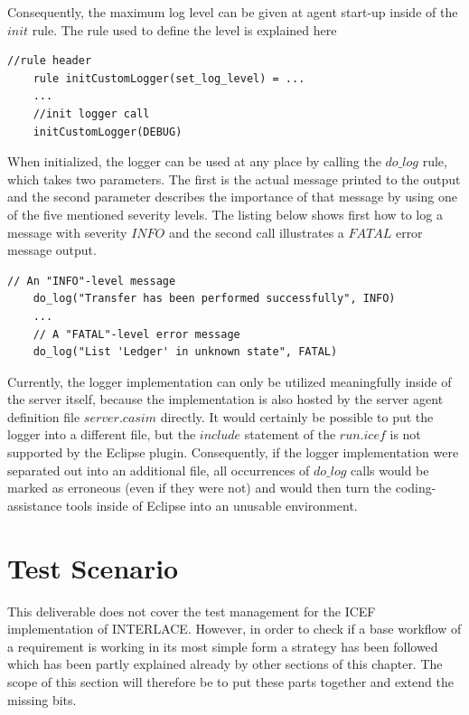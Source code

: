 Consequently, the maximum log level can be given at agent start-up inside of the $init$ rule. The rule used to define the level is explained here

\begin{lstlisting}[language=bsl]
	//rule header
	rule initCustomLogger(set_log_level) = ...
	...
	//init logger call
	initCustomLogger(DEBUG)
\end{lstlisting}

When initialized, the logger can be used at any place by calling the $do\_log$ rule, which takes two parameters. The first is the actual message printed to the output and the second parameter describes the importance of that message by using one of the five mentioned severity levels. The listing below shows first how to log a message with severity $INFO$ and the second call illustrates a $FATAL$ error message output.
	
\begin{lstlisting}[language=bsl]
	// An "INFO"-level message
	do_log("Transfer has been performed successfully", INFO)
	...
	// A "FATAL"-level error message
	do_log("List 'Ledger' in unknown state", FATAL)
\end{lstlisting}

Currently, the logger implementation can only be utilized meaningfully inside of the server itself, because the implementation is also hosted by the server agent definition file $server.casim$ directly. It would certainly be possible to put the logger into a different file, but the $include$ statement of the $run.icef$ is not supported by the Eclipse plugin. Consequently, if the logger implementation were separated out into an additional file, all occurrences of $do\_log$ calls would be marked as erroneous (even if they were not) and would then turn the coding-assistance tools inside of Eclipse into an unusable environment.


\section{Test Scenario}
\label{sec:impl-test}

This deliverable does not cover the test management for the ICEF implementation of INTERLACE. However, in order to check if a base workflow of a requirement is working in its most simple form a strategy has been followed which has been partly explained already by other sections of this chapter. The scope of this section will therefore be to put these parts together and extend the missing bits.

